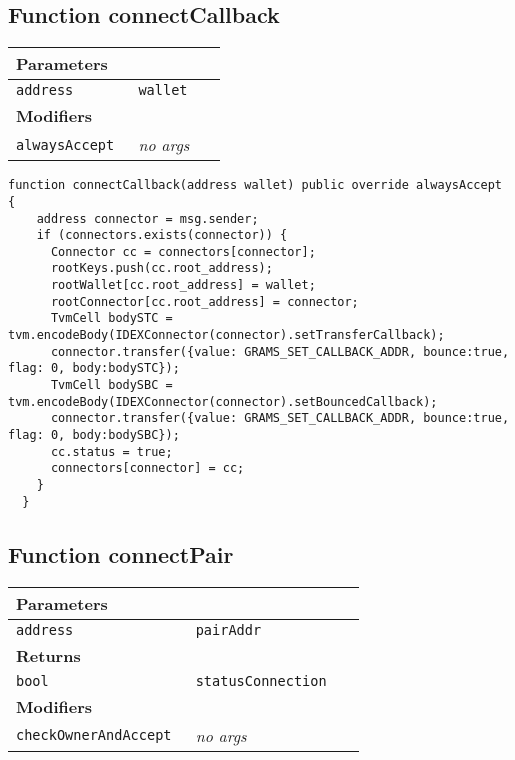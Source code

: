 \subsection{Function connectCallback}


\ifsoltables
\noindent\begin{tabular}{|l|l|p{5cm}|}\hline
\multicolumn{3}{|l|}{\bf Parameters}\\\hline
\tt address & \tt wallet &\\\hline
\multicolumn{3}{|l|}{\bf Modifiers}\\\hline
\tt alwaysAccept & {\em no args} &\\\hline
\end{tabular}
\fi

\vspace{2cm}

\begin{lstlisting}[firstnumber=181]
  function connectCallback(address wallet) public override alwaysAccept {
    address connector = msg.sender;
    if (connectors.exists(connector)) {
      Connector cc = connectors[connector];
      rootKeys.push(cc.root_address);
      rootWallet[cc.root_address] = wallet;
      rootConnector[cc.root_address] = connector;
      TvmCell bodySTC = tvm.encodeBody(IDEXConnector(connector).setTransferCallback);
      connector.transfer({value: GRAMS_SET_CALLBACK_ADDR, bounce:true, flag: 0, body:bodySTC});
      TvmCell bodySBC = tvm.encodeBody(IDEXConnector(connector).setBouncedCallback);
      connector.transfer({value: GRAMS_SET_CALLBACK_ADDR, bounce:true, flag: 0, body:bodySBC});
      cc.status = true;
      connectors[connector] = cc;
    }
  }
\end{lstlisting}

\subsection{Function connectPair}


\ifsoltables
\noindent\begin{tabular}{|l|l|p{5cm}|}\hline
\multicolumn{3}{|l|}{\bf Parameters}\\\hline
\tt address & \tt pairAddr &\\\hline
\multicolumn{3}{|l|}{\bf Returns}\\\hline
\tt bool & \tt statusConnection &\\\hline
\multicolumn{3}{|l|}{\bf Modifiers}\\\hline
\tt checkOwnerAndAccept & {\em no args} &\\\hline
\end{tabular}
\fi

